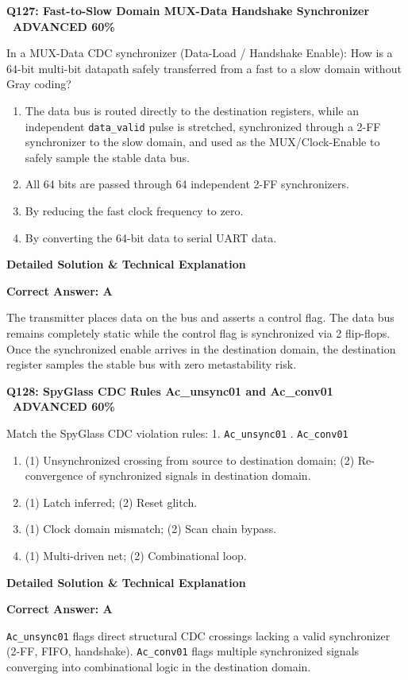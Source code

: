 \documentclass[11pt,a4paper]{article}
\newcommand{\badgeadv}{{\color{white}\colorbox{advred}{\bfseries\sffamily\tiny\ ADVANCED 60\%\ }}}
\newenvironment{qbox}[2]{%
  \begin{mdframed}[style=qstyle]%
  {\bfseries\sffamily\color{primaryblue}#1 \hfill #2}\par\vspace{2pt}%
}{%
  \end{mdframed}%
}
\newenvironment{ansbox}{%
  \begin{mdframed}[style=ansstyle]%
  {\bfseries\sffamily\color{ansgreen}\small Detailed Solution \& Technical Explanation}\par\vspace{2pt}\small%
}{%
  \end{mdframed}%
}
\begin{document}
\begin{qbox}{Q127: Fast-to-Slow Domain MUX-Data Handshake Synchronizer}{\badgeadv}
In a MUX-Data CDC synchronizer (Data-Load / Handshake Enable):
How is a 64-bit multi-bit datapath safely transferred from a fast to a slow domain without Gray coding?
\begin{enumerate}[label=\textbf{\Alph*.}]
  \item The data bus is routed directly to the destination registers, while an independent \texttt{data\_valid} pulse is stretched, synchronized through a 2-FF synchronizer to the slow domain, and used as the MUX/Clock-Enable to safely sample the stable data bus.
  \item All 64 bits are passed through 64 independent 2-FF synchronizers.
  \item By reducing the fast clock frequency to zero.
  \item By converting the 64-bit data to serial UART data.
\end{enumerate}
\end{qbox}
\begin{ansbox}
\textbf{Correct Answer: A}

The transmitter places data on the bus and asserts a control flag. The data bus remains completely static while the control flag is synchronized via 2 flip-flops. Once the synchronized enable arrives in the destination domain, the destination register samples the stable bus with zero metastability risk.
\end{ansbox}

\begin{qbox}{Q128: SpyGlass CDC Rules Ac\_unsync01 and Ac\_conv01}{\badgeadv}
Match the SpyGlass CDC violation rules:
1. \texttt{Ac\_unsync01} . \texttt{Ac\_conv01}
\begin{enumerate}[label=\textbf{\Alph*.}]
  \item (1) Unsynchronized crossing from source to destination domain; (2) Re-convergence of synchronized signals in destination domain.
  \item (1) Latch inferred; (2) Reset glitch.
  \item (1) Clock domain mismatch; (2) Scan chain bypass.
  \item (1) Multi-driven net; (2) Combinational loop.
\end{enumerate}
\end{qbox}
\begin{ansbox}
\textbf{Correct Answer: A}

\texttt{Ac\_unsync01} flags direct structural CDC crossings lacking a valid synchronizer (2-FF, FIFO, handshake). \texttt{Ac\_conv01} flags multiple synchronized signals converging into combinational logic in the destination domain.
\end{ansbox}
\end{document}
